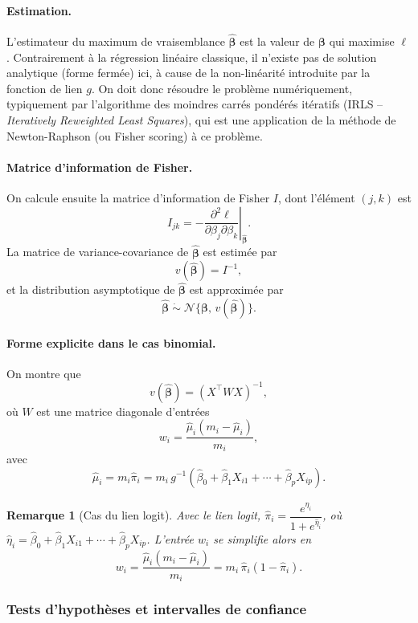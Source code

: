 \documentclass[11pt,letterpaper]{article}
\newtheorem{remarque}{Remarque}[section]
\begin{document}
\paragraph{Estimation.}
L'estimateur du maximum de vraisemblance $\hat{\boldsymbol{\beta}}$ est la valeur de $\boldsymbol{\beta}$ qui maximise $\ell$. Contrairement à la régression linéaire classique, il n'existe pas de solution analytique (forme fermée) ici, à cause de la non-linéarité introduite par la fonction de lien $g$. On doit donc résoudre le problème numériquement, typiquement par l'algorithme des moindres carrés pondérés itératifs (IRLS -- \emph{Iteratively Reweighted Least Squares}), qui est une application de la méthode de Newton-Raphson (ou Fisher scoring) à ce problème.

\paragraph{Matrice d'information de Fisher.}
On calcule ensuite la matrice d'information de Fisher $I$, dont l'élément $(j,k)$ est
\[
I_{jk} = -\left.\frac{\partial^2 \ell}{\partial \beta_j \partial \beta_k}\right|_{\hat{\boldsymbol{\beta}}}.
\]
La matrice de variance-covariance de $\hat{\boldsymbol\beta}$ est estimée par
\[
v(\hat{\boldsymbol\beta}) = I^{-1},
\]
et la distribution asymptotique de $\hat{\boldsymbol\beta}$ est approximée par
\[
\hat{\boldsymbol\beta} \;\dot\sim\; \mathcal{N}\{\boldsymbol\beta,\, v(\hat{\boldsymbol\beta})\}.
\]

\paragraph{Forme explicite dans le cas binomial.}
On montre que
\[
v(\hat{\boldsymbol\beta}) = (X^\top W X)^{-1},
\]
où $W$ est une matrice diagonale d'entrées
\[
w_i = \frac{\hat\mu_i (m_i - \hat\mu_i)}{m_i},
\]
avec
\[
\hat\mu_i = m_i \hat\pi_i = m_i\, g^{-1}(\hat\beta_0 + \hat\beta_1 X_{i1} + \cdots + \hat\beta_p X_{ip}).
\]

\begin{remarque}[Cas du lien logit]

Avec le lien logit, $\hat\pi_i = \dfrac{e^{\hat\eta_i}}{1+e^{\hat\eta_i}}$, où $\hat\eta_i = \hat\beta_0 + \hat\beta_1 X_{i1} + \cdots + \hat\beta_p X_{ip}$. L'entrée $w_i$ se simplifie alors en
\[
w_i = \frac{\hat\mu_i(m_i - \hat\mu_i)}{m_i} = m_i\, \hat\pi_i(1-\hat\pi_i).
\]
\end{remarque}
\subsubsection{Tests d'hypothèses et intervalles de confiance}
\end{document}
